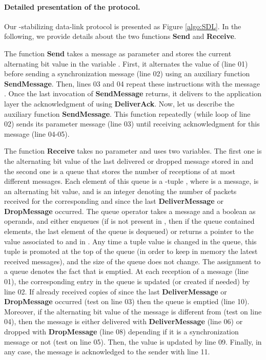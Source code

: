\documentclass[11pt]{article}
\begin{document}
\paragraph{Detailed presentation of the protocol.}
Our -stabilizing data-link protocol  is presented as Figure \ref{algo:SDL}. In the following, we provide details about the two functions \textbf{Send} and \textbf{Receive}.

The function \textbf{Send} takes a message  as parameter and stores the current alternating bit value in the variable . First, it alternates the value of  (line 01) before sending a synchronization message (line 02) using an auxiliary function \textbf{SendMessage}. Then, lines 03 and 04 repeat these instructions with the message . Once the last invocation of \textbf{SendMessage} returns, it delivers to the application layer the acknowledgment of  using \textbf{DeliverAck}. Now, let us describe the auxiliary function \textbf{SendMessage}. This function repeatedly (while loop of line 02) sends its parameter message  (line 03) until receiving  acknowledgment for this message (line 04-05).

The function \textbf{Receive} takes no parameter and uses two variables. The first one is the alternating bit value of the last delivered or dropped message stored in  and the second one is a queue  that stores the number of receptions of at most  different messages. Each element of this queue is a  -tuple , where  is a message,  is an alternating bit value, and  is an integer denoting the number of packets  received for the corresponding  and  since the last \textbf{DeliverMessage} or \textbf{DropMessage} occurred. The queue  operator takes a message  and a boolean  as operands, and either enqueues  (if  is not present in , then if the queue contained  elements, the last element of the queue is dequeued) or returns a pointer to the  value associated to  and  in . Any time a tuple value is changed in the queue, this tuple is promoted at the top of the queue (in order to keep in memory the  latest received messages), and the size of the queue does not change. The  assignment to a queue  denotes the fact that  is emptied. At each reception of a message  (line 01), the corresponding entry in the queue is updated (or created if needed) by line 02. If  already received  copies of  since the last \textbf{DeliverMessage} or \textbf{DropMessage} occurred (test on line 03) then the queue is emptied (line 10). Moreover, if the alternating bit value of the message is different from  (test on line 04), then the message is either delivered with \textbf{DeliverMessage} (line 06) or dropped with \textbf{DropMessage} (line 08) depending if it is a synchronization message or not (test on line 05). Then, the  value is updated by line 09. Finally, in any case, the message is acknowledged to the sender with line 11.
\end{document}
